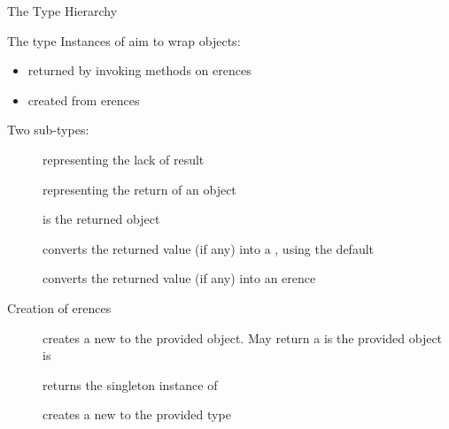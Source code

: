 \documentclass[handout]{beamer}
\begin{document}
\begin{frame}[allowframebreaks]{The  Type Hierarchy}
    \framebreak

    \begin{block}{The  type}
        Instances of  aim to wrap objects:
        \begin{itemize}
            \item returned by invoking methods on erences
            \item created from erences
        \end{itemize}

        Two sub-types:
        \begin{description}
            \item[] representing the lack of result
            \item[] representing the return of an object   
        \end{description}
    \end{block}
    \begin{description}
        \item[] is the returned object
        
        \item[] converts the returned value (if any) into a , using the default 
        
        \item[] converts the returned value (if any) into an erence
    \end{description}

\end{frame}

\begin{frame}{Creation of erences}
    \begin{description}
        \item[] creates a new  to the provided object. May return a  is the provided object is 
        
        \bigskip

        \item[] returns the singleton instance of 
        
        \bigskip
        
        \item[] creates a new  to the provided type 
    \end{description}
\end{frame}
\end{document}

